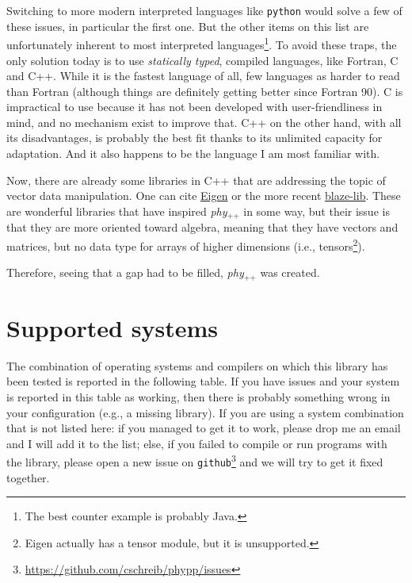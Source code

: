\documentclass[12pt]{report}
\newcommand{\phypp}{\textit{phy}$_{\text{++}}$\xspace}
\begin{document}
Switching to more modern interpreted languages like \texttt{python} would solve a few of these issues, in particular the first one. But the other items on this list are unfortunately inherent to most interpreted languages\footnote{The best counter example is probably Java.}. To avoid these traps, the only solution today is to use \emph{statically typed}, compiled languages, like Fortran, C and C++. While it is the fastest language of all, few languages as harder to read than Fortran (although things are definitely getting better since Fortran 90). C is impractical to use because it has not been developed with user-friendliness in mind, and no mechanism exist to improve that. C++ on the other hand, with all its disadvantages, is probably the best fit thanks to its unlimited capacity for adaptation. And it also happens to be the language I am most familiar with.

Now, there are already some libraries in C++ that are addressing the topic of vector data manipulation. One can cite \href{http://eigen.tuxfamily.org}{Eigen} or the more recent \href{https://code.google.com/p/blaze-lib/}{blaze-lib}. These are wonderful libraries that have inspired \phypp in some way, but their issue is that they are more oriented toward algebra, meaning that they have vectors and matrices, but no data type for arrays of higher dimensions (i.e., tensors\footnote{Eigen actually has a tensor module, but it is unsupported.}).

Therefore, seeing that a gap had to be filled, \phypp was created.

\section{Supported systems \label{SEC:intro:supported}}

The combination of operating systems and compilers on which this library has been tested is reported in the following table. If you have issues and your system is reported in this table as working, then there is probably something wrong in your configuration (e.g., a missing library). If you are using a system combination that is not listed here: if you managed to get it to work, please drop me an email and I will add it to the list; else, if you failed to compile or run programs with the library, please open a new issue on \texttt{github}\footnote{\url{https://github.com/cschreib/phypp/issues}} and we will try to get it fixed together.
\end{document}
